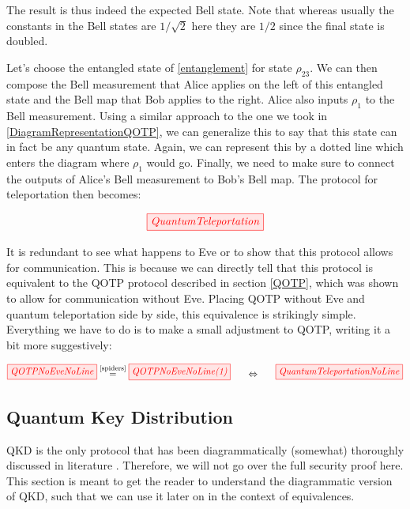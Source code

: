 \documentclass[]{article}
\newcommand{\equaltext}[1]{\ensuremath{\stackrel{\text{#1}}{=}}}
\begin{document}
The result is thus indeed the expected Bell state. Note that whereas usually the constants in the Bell states are $1/\sqrt{2}$ here they are $1/2$ since the final state is doubled.

Let's choose the entangled state of \ref{entanglement} for state $\rho_{23}$. We can then compose the Bell measurement that Alice applies on the left of this entangled state and the Bell map that Bob applies to the right. Alice also inputs $\rho_1$ to the Bell measurement. Using a similar approach to the one we took in \ref{DiagramRepresentationQOTP}, we can generalize this to say that this state can in fact be any quantum state. Again, we can represent this by a dotted line which enters the diagram where $\rho_1$ would go. Finally, we need to make sure to connect the outputs of Alice's Bell measurement to Bob's Bell map. The protocol for teleportation then becomes: 
 
\begin{equation}
	\tikzfig{QuantumTeleportation}
\end{equation}
 
It is redundant to see what happens to Eve or to show that this protocol allows for communication. This is because we can directly tell that this protocol is equivalent to the QOTP protocol described in section \ref{QOTP}, which was shown to allow for communication without Eve. Placing QOTP without Eve and quantum teleportation side by side, this equivalence is strikingly simple. Everything we have to do is to make a small adjustment to QOTP, writing it a bit more suggestively:

\begin{equation}
\label{equation:QOTPQuantumTeleportationEquivalence}
\tikzfig{QOTPNoEveNoLine} \equaltext{\ref{spiders}} \tikzfig{QOTPNoEveNoLine(1)}~~~~~ \Leftrightarrow ~~~~~\tikzfig{QuantumTeleportationNoLine}
\end{equation}
 
\subsection{Quantum Key Distribution}

\label{QuantumKeyDistribution}

QKD is the only protocol that has been diagrammatically (somewhat) thoroughly discussed in literature \cite{Kissinger2017}. Therefore, we will not go over the full security proof here. This section is meant to get the reader to understand the diagrammatic version of QKD, such that we can use it later on in the context of equivalences.
\end{document}
